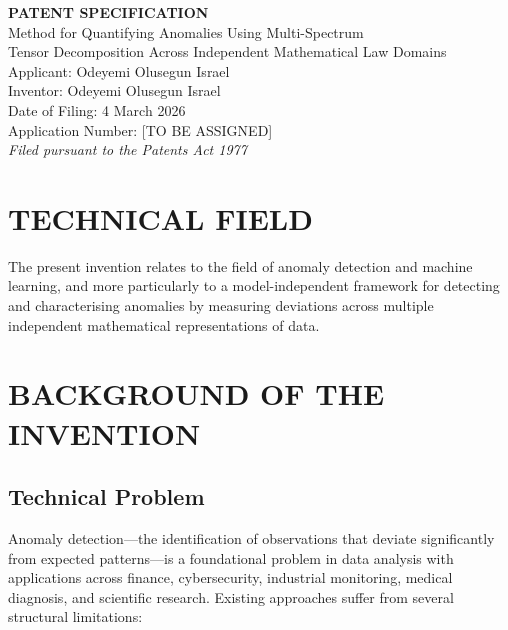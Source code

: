 \documentclass[12pt,a4paper]{article}
\begin{document}
\begin{center}
{\LARGE\bfseries PATENT SPECIFICATION}\\[1em]
{\Large Method for Quantifying Anomalies Using Multi-Spectrum\\
Tensor Decomposition Across Independent Mathematical Law Domains}\\[2em]
{\large Applicant: Odeyemi Olusegun Israel}\\[0.5em]
{\large Inventor: Odeyemi Olusegun Israel}\\[0.5em]
{\large Date of Filing: 4 March 2026}\\[0.5em]
{\large Application Number: [TO BE ASSIGNED]}\\[0.3em]
{\normalsize \textit{Filed pursuant to the Patents Act 1977}}
\end{center}

\vspace{2em}

\section{TECHNICAL FIELD}

The present invention relates to the field of anomaly detection and 
machine learning, and more particularly to a model-independent framework 
for detecting and characterising anomalies by measuring deviations across 
multiple independent mathematical representations of data.

\section{BACKGROUND OF THE INVENTION}

\subsection{Technical Problem}

Anomaly detection---the identification of observations that deviate 
significantly from expected patterns---is a foundational problem in data 
analysis with applications across finance, cybersecurity, industrial 
monitoring, medical diagnosis, and scientific research. Existing approaches 
suffer from several structural limitations:
\end{document}
